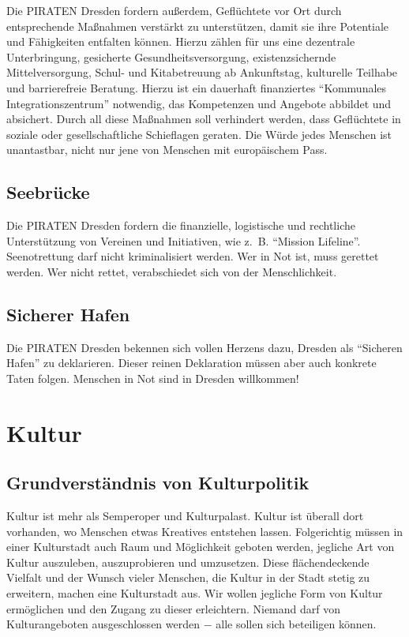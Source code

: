 \documentclass[a4paper, 11pt]{article}
\begin{document}
Die PIRATEN Dresden fordern außerdem, Geflüchtete vor Ort durch entsprechende Maßnahmen verstärkt zu unterstützen, damit sie ihre Potentiale und Fähigkeiten entfalten können. Hierzu zählen für uns eine dezentrale Unterbringung, gesicherte Gesundheitsversorgung, existenzsichernde Mittelversorgung, Schul- und Kitabetreuung ab Ankunftstag, kulturelle Teilhabe und barrierefreie Beratung. Hierzu ist ein dauerhaft finanziertes ``Kommunales Integrationszentrum'' notwendig, das Kompetenzen und Angebote abbildet und absichert. Durch all diese Maßnahmen soll verhindert werden, dass Geflüchtete in soziale oder gesellschaftliche Schieflagen geraten. Die Würde jedes Menschen ist unantastbar, nicht nur jene von Menschen mit europäischem Pass.








\subsection{Seebrücke}
Die PIRATEN Dresden fordern die finanzielle, logistische und rechtliche Unterstützung von Vereinen und Initiativen, wie z. B. ``Mission Lifeline''. Seenotrettung darf nicht kriminalisiert werden. Wer in Not ist, muss gerettet werden. Wer nicht rettet, verabschiedet sich von der Menschlichkeit.


\subsection{Sicherer Hafen}
Die PIRATEN Dresden bekennen sich vollen Herzens dazu, Dresden als ``Sicheren Hafen'' zu deklarieren. Dieser reinen Deklaration müssen aber auch konkrete Taten folgen. Menschen in Not sind in Dresden willkommen!


\section{Kultur}

\subsection{Grundverständnis von Kulturpolitik}
Kultur ist mehr als Semperoper und Kulturpalast. Kultur ist überall dort vorhanden, wo Menschen etwas Kreatives entstehen lassen. Folgerichtig müssen in einer Kulturstadt auch Raum und Möglichkeit geboten werden, jegliche Art von Kultur auszuleben, auszuprobieren und umzusetzen. Diese flächendeckende Vielfalt und der Wunsch vieler Menschen, die Kultur in der Stadt stetig zu erweitern, machen eine Kulturstadt aus. Wir wollen jegliche Form von Kultur ermöglichen und den Zugang zu dieser erleichtern. Niemand darf von Kulturangeboten ausgeschlossen werden $-$ alle sollen sich beteiligen können.
\end{document}
